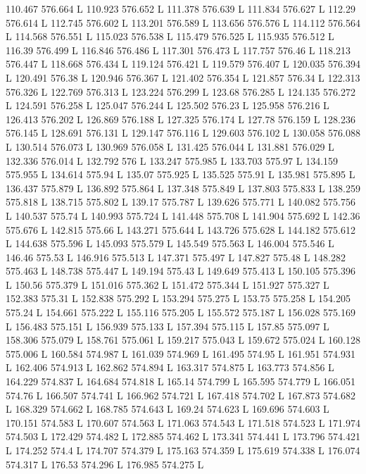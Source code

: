 110.467 576.664 L
110.923 576.652 L
111.378 576.639 L
111.834 576.627 L
112.29 576.614 L
112.745 576.602 L
113.201 576.589 L
113.656 576.576 L
114.112 576.564 L
114.568 576.551 L
115.023 576.538 L
115.479 576.525 L
115.935 576.512 L
116.39 576.499 L
116.846 576.486 L
117.301 576.473 L
117.757 576.46 L
118.213 576.447 L
118.668 576.434 L
119.124 576.421 L
119.579 576.407 L
120.035 576.394 L
120.491 576.38 L
120.946 576.367 L
121.402 576.354 L
121.857 576.34 L
122.313 576.326 L
122.769 576.313 L
123.224 576.299 L
123.68 576.285 L
124.135 576.272 L
124.591 576.258 L
125.047 576.244 L
125.502 576.23 L
125.958 576.216 L
126.413 576.202 L
126.869 576.188 L
127.325 576.174 L
127.78 576.159 L
128.236 576.145 L
128.691 576.131 L
129.147 576.116 L
129.603 576.102 L
130.058 576.088 L
130.514 576.073 L
130.969 576.058 L
131.425 576.044 L
131.881 576.029 L
132.336 576.014 L
132.792 576 L
133.247 575.985 L
133.703 575.97 L
134.159 575.955 L
134.614 575.94 L
135.07 575.925 L
135.525 575.91 L
135.981 575.895 L
136.437 575.879 L
136.892 575.864 L
137.348 575.849 L
137.803 575.833 L
138.259 575.818 L
138.715 575.802 L
139.17 575.787 L
139.626 575.771 L
140.082 575.756 L
140.537 575.74 L
140.993 575.724 L
141.448 575.708 L
141.904 575.692 L
142.36 575.676 L
142.815 575.66 L
143.271 575.644 L
143.726 575.628 L
144.182 575.612 L
144.638 575.596 L
145.093 575.579 L
145.549 575.563 L
146.004 575.546 L
146.46 575.53 L
146.916 575.513 L
147.371 575.497 L
147.827 575.48 L
148.282 575.463 L
148.738 575.447 L
149.194 575.43 L
149.649 575.413 L
150.105 575.396 L
150.56 575.379 L
151.016 575.362 L
151.472 575.344 L
151.927 575.327 L
152.383 575.31 L
152.838 575.292 L
153.294 575.275 L
153.75 575.258 L
154.205 575.24 L
154.661 575.222 L
155.116 575.205 L
155.572 575.187 L
156.028 575.169 L
156.483 575.151 L
156.939 575.133 L
157.394 575.115 L
157.85 575.097 L
158.306 575.079 L
158.761 575.061 L
159.217 575.043 L
159.672 575.024 L
160.128 575.006 L
160.584 574.987 L
161.039 574.969 L
161.495 574.95 L
161.951 574.931 L
162.406 574.913 L
162.862 574.894 L
163.317 574.875 L
163.773 574.856 L
164.229 574.837 L
164.684 574.818 L
165.14 574.799 L
165.595 574.779 L
166.051 574.76 L
166.507 574.741 L
166.962 574.721 L
167.418 574.702 L
167.873 574.682 L
168.329 574.662 L
168.785 574.643 L
169.24 574.623 L
169.696 574.603 L
170.151 574.583 L
170.607 574.563 L
171.063 574.543 L
171.518 574.523 L
171.974 574.503 L
172.429 574.482 L
172.885 574.462 L
173.341 574.441 L
173.796 574.421 L
174.252 574.4 L
174.707 574.379 L
175.163 574.359 L
175.619 574.338 L
176.074 574.317 L
176.53 574.296 L
176.985 574.275 L

